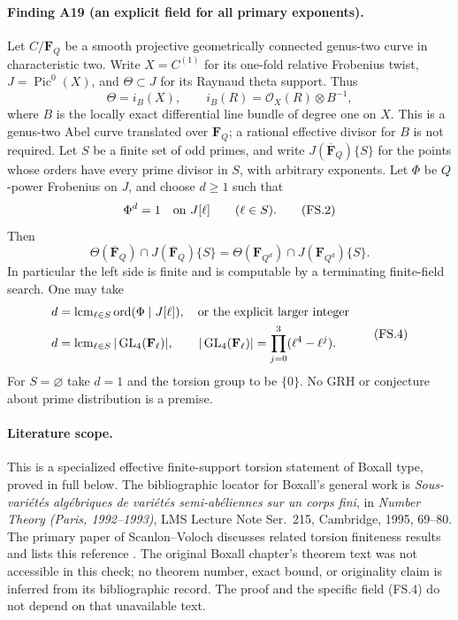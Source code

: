 \documentclass[11pt,a4paper]{article}
\begin{document}
\paragraph{Finding A19 (an explicit field for all primary exponents).}
Let $C/\mathbf F_Q$ be a smooth projective geometrically connected
genus-two curve in characteristic two. Write $X=C^{(1)}$ for its
one-fold relative Frobenius twist, $J=\operatorname{Pic}^0(X)$,
and $\Theta\subset J$ for its Raynaud theta support. Thus
\[
 \Theta=i_B(X),\qquad
 i_B(R)=\mathcal O_X(R)\otimes B^{-1},
                                                               \tag{FS.1}
\]
where $B$ is the locally exact differential line bundle of degree
one on $X$. This is a genus-two Abel curve translated over
$\mathbf F_Q$; a rational effective divisor for $B$ is not required.
Let $S$ be a finite set of odd primes, and write $J(\overline{\mathbf
F}_Q)\{S\}$ for the points whose orders have every prime divisor in
$S$, with arbitrary exponents. Let $\Phi$ be $Q$-power Frobenius on
$J$, and choose $d\ge1$ such that
\[
            \Phi^d=1\quad\hbox{on }J[\ell]
                         \qquad(\ell\in S).                  \tag{FS.2}
\]
Then
\[
 \Theta(\overline{\mathbf F}_Q)\cap J(\overline{\mathbf F}_Q)\{S\}
   =\Theta(\mathbf F_{Q^d})\cap J(\mathbf F_{Q^d})\{S\}.
                                                               \tag{FS.3}
\]
In particular the left side is finite and is computable by a
terminating finite-field search. One may take
\[
 \begin{split}
 d&=\operatorname{lcm}_{\ell\in S}
                  \operatorname{ord}(\Phi\mid J[\ell]),
       \quad\hbox{or the explicit larger integer}\\
 d&=\operatorname{lcm}_{\ell\in S}
                    |\operatorname{GL}_4(\mathbf F_\ell)|,
 \qquad |\operatorname{GL}_4(\mathbf F_\ell)|
                   =\prod_{j=0}^3(\ell^4-\ell^j).
 \end{split}                                                   \tag{FS.4}
\]
For $S=\varnothing$ take $d=1$ and the torsion group to be $\{0\}$.
No GRH or conjecture about prime distribution is a premise.

\paragraph{Literature scope.}
This is a specialized effective finite-support torsion statement
of Boxall type, proved in full below. The bibliographic locator
for Boxall's general work is
\emph{Sous-vari\'et\'es alg\'ebriques de vari\'et\'es
semi-ab\'eliennes sur un corps fini}, in \emph{Number Theory
(Paris, 1992--1993)}, LMS Lecture Note Ser.~215, Cambridge, 1995,
69--80. The primary paper of Scanlon--Voloch discusses related torsion
finiteness results and lists this reference
\cite[Introduction and reference \textnormal{[Box]}]{ScanlonVoloch1999}.
The original Boxall chapter's theorem text was not accessible in
this check; no theorem number, exact bound, or originality claim
is inferred from its bibliographic record. The proof and the
specific field (FS.4) do not depend on that unavailable text.
\end{document}

